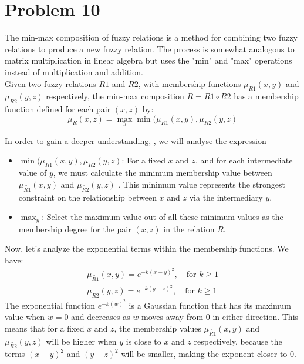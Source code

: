 \section{Problem 10}
The min-max composition of fuzzy relations is a method for combining two fuzzy relations to produce a new fuzzy relation. The process is somewhat analogous to matrix multiplication in linear algebra but uses the "min" and "max" operations instead of multiplication and addition. \\

Given two fuzzy relations $R1$ and $R2$, with membership functions $\mu_{\tilde{R1}}(x,y)$ and $\mu_{\tilde{R2}}(y,z)$ respectively, the min-max composition $R = R1 \circ R2 $ has a membership function defined for each pair $(x,z)$ by:
\begin{equation}
	\mu_R(x, z) = \max_{y} \min(\mu_{R1}(x, y), \mu_{R2}(y, z)
\end{equation}

In order to gain a deeper understanding, , we will analyse the expression
\begin{itemize}
	\item $\min(\mu_{R1}(x, y), \mu_{R2}(y, z)$: For a fixed $x$ and $z$, and for each intermediate value of $y$, we must calculate the minimum membership value between 
	$\mu_{\tilde{R1}}(x,y)$ and $\mu_{\tilde{R2}}(y,z)$ . This minimum value represents the strongest constraint on the relationship between $x$ and $z$ via the intermediary $y$.
	\item $\max_{y} $: Select the maximum value out of all these minimum values as the membership degree for the pair $(x,z)$ in the relation $R$.
\end{itemize}

Now, let's analyze the exponential terms within the membership functions. We have:
\begin{align}
	\mu_{\tilde{R1}}(x,y) = e^{-k(x - y)^2}, \quad \text{for } k \geq 1 \\
	\mu_{\tilde{R2}}(y,z) = e^{-k(y - z)^2}, \quad \text{for } k \geq 1
\end{align}
The exponential function $e^{-k(w)^2}$  is a Gaussian function that has its maximum value when 
$w=0$ and decreases as $w$ moves away from $0$ in either direction. This means that for a fixed 
$x$ and $z$, the membership values $\mu_{\tilde{R1}}(x,y)$ and $\mu_{\tilde{R2}}(y,z)$ will be higher when $y$ is close to $x$ and $z$ respectively, because the terms $(x-y)^2$ and $(y-z)^2$ will be smaller, making the exponent closer to $0$.\\

